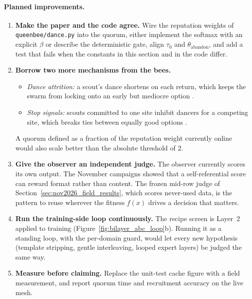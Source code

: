 \documentclass[11pt,a4paper]{article}
\begin{document}
\paragraph{Planned improvements.}
\begin{enumerate}[leftmargin=1.8em,itemsep=2pt]
  \item \textbf{Make the paper and the code agree.} Wire the reputation weights of \texttt{queenbee/dance.py} into the
    quorum, either implement the softmax with an explicit $\beta$ or describe the deterministic gate, align $\tau_0$ and
    $\theta_{\text{abandon}}$, and add a test that fails when the constants in this section and in the code differ.
  \item \textbf{Borrow two more mechanisms from the bees.}
    \begin{itemize}[leftmargin=1.4em,itemsep=1pt]
      \item \emph{Dance attrition:} a scout's dance shortens on each return, which keeps the swarm from locking onto an
        early but mediocre option \cite{seeley2010honeybee}.
      \item \emph{Stop signals:} scouts committed to one site inhibit dancers for a competing site, which breaks ties
        between equally good options \cite{seeley2012stop}.
    \end{itemize}
    A quorum defined as a fraction of the reputation weight currently online would also scale better than the absolute
    threshold of 2.
  \item \textbf{Give the observer an independent judge.} The observer currently scores its own output. The November
    campaigns showed that a self-referential score can reward format rather than content. The frozen mid-row judge of
    Section~\ref{sec:nov2026_field_results}, which scores never-used data, is the pattern to reuse wherever the fitness
    $f(x)$ drives a decision that matters.
  \item \textbf{Run the training-side loop continuously.} The recipe screen is Layer~2 applied to training
    (Figure~\ref{fig:bilayer_abc_loop}b). Running it as a standing loop, with the per-domain guard, would let every new
    hypothesis (template stripping, gentle interleaving, looped expert layers) be judged the same way.
  \item \textbf{Measure before claiming.} Replace the unit-test cache figure with a field measurement, and report
    quorum time and recruitment accuracy on the live mesh.
\end{enumerate}
\end{document}
